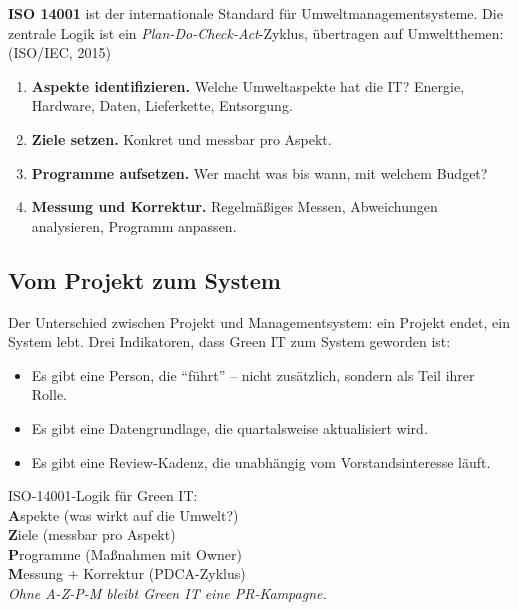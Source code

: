 \documentclass[11pt,a4paper,oneside]{article}
\newcommand{\caveatfontfallback}{\itshape}
\newcommand\caveatfont{\caveatfontfallback}%
\newcommand{\akzent}[1]{{\caveatfont\color{lpAmber}#1}}
\newcommand{\fachbegriff}[1]{\textbf{#1}}
\newcommand{\quelle}[1]{{\footnotesize\color{lpGray}(#1)}}
\begin{document}
\fachbegriff{ISO 14001} ist der internationale Standard für Umweltmanagementsysteme. Die zentrale Logik ist ein \emph{Plan-Do-Check-Act}-Zyklus, übertragen auf Umweltthemen: \quelle{ISO/IEC, 2015}

\begin{enumerate}
  \item \fachbegriff{Aspekte identifizieren.} Welche Umweltaspekte hat die IT? Energie, Hardware, Daten, Lieferkette, Entsorgung.
  \item \fachbegriff{Ziele setzen.} Konkret und messbar pro Aspekt.
  \item \fachbegriff{Programme aufsetzen.} Wer macht was bis wann, mit welchem Budget?
  \item \fachbegriff{Messung und Korrektur.} Regelmäßiges Messen, Abweichungen analysieren, Programm anpassen.
\end{enumerate}

\subsection{Vom Projekt zum System}

Der Unterschied zwischen Projekt und Managementsystem: ein Projekt endet, ein System lebt. Drei Indikatoren, dass Green IT zum System geworden ist:

\begin{itemize}
  \item Es gibt eine Person, die ``führt'' -- nicht zusätzlich, sondern als Teil ihrer Rolle.
  \item Es gibt eine Datengrundlage, die quartalsweise aktualisiert wird.
  \item Es gibt eine Review-Kadenz, die unabhängig vom Vorstandsinteresse läuft.
\end{itemize}

\begin{eselsbox}[Eselsbrücke: \akzent{A-Z-P-M}]
ISO-14001-Logik für Green IT:\\[2pt]
\textbf{A}spekte (was wirkt auf die Umwelt?)\\
\textbf{Z}iele (messbar pro Aspekt)\\
\textbf{P}rogramme (Maßnahmen mit Owner)\\
\textbf{M}essung + Korrektur (PDCA-Zyklus)\\[2pt]
\emph{Ohne A-Z-P-M bleibt Green IT eine PR-Kampagne.}
\end{eselsbox}

\end{document}
